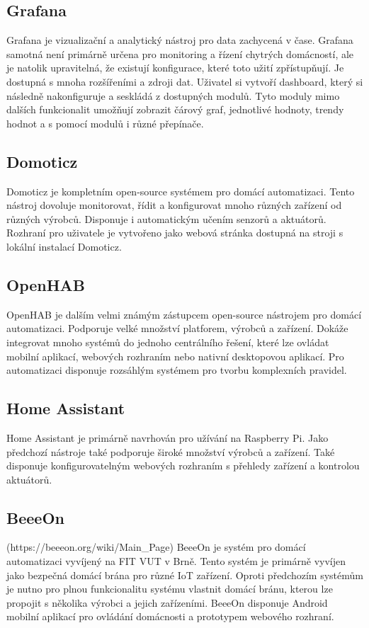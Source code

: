 \documentclass[11pt,a4paper]{article}
\begin{document}
\subsection{Grafana}
Grafana je vizualizační a analytický nástroj pro data zachycená v čase. Grafana samotná není primárně určena pro monitoring a řízení chytrých domácností, ale je natolik upravitelná, že existují konfigurace, které toto užití zpřístupňují. Je dostupná s mnoha rozšířeními a zdroji dat. Uživatel si vytvoří dashboard, který si následně nakonfiguruje a seskládá z dostupných modulů. Tyto moduly mimo dalších funkcionalit umožňují zobrazit čárový graf, jednotlivé hodnoty, trendy hodnot a s pomocí modulů i různé přepínače.

\subsection{Domoticz}
Domoticz je kompletním open-source systémem pro domácí automatizaci. Tento nástroj dovoluje monitorovat, řídit a konfigurovat mnoho různých zařízení od různých výrobců. Disponuje i automatickým učením senzorů a aktuátorů. Rozhraní pro uživatele je vytvořeno jako webová stránka dostupná na stroji s lokální instalací Domoticz.

\subsection{OpenHAB}
OpenHAB je dalším velmi známým zástupcem open-source nástrojem pro domácí automatizaci. Podporuje velké množství platforem, výrobců a zařízení. Dokáže integrovat mnoho systémů do jednoho centrálního řešení, které lze ovládat mobilní aplikací, webových rozhraním nebo nativní desktopovou aplikací. Pro automatizaci disponuje rozsáhlým systémem pro tvorbu komplexních pravidel.

\subsection{Home Assistant}
Home Assistant je primárně navrhován pro užívání na Raspberry Pi. Jako předchozí nástroje také podporuje široké množství výrobců a zařízení. Také disponuje konfigurovatelným webových rozhraním s přehledy zařízení a kontrolou aktuátorů.

\subsection{BeeeOn}
(https://beeeon.org/wiki/Main\_Page)
BeeeOn je systém pro domácí automatizaci vyvíjený na FIT VUT v Brně. Tento systém je primárně vyvíjen jako bezpečná domácí brána pro různé IoT zařízení. Oproti předchozím systémům je nutno pro plnou funkcionalitu systému vlastnit domácí bránu, kterou lze propojit s několika výrobci a jejich zařízeními. BeeeOn disponuje Android mobilní aplikací pro ovládání domácnosti a prototypem webového rozhraní.
\end{document}
